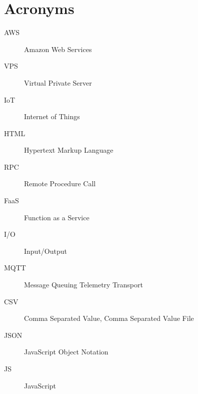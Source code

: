 \documentclass[../main.tex]{subfiles}
\begin{document}
\chapter{Acronyms}

\begin{description}
  \item[AWS] Amazon Web Services
  \item[VPS] Virtual Private Server
  \item[IoT] Internet of Things
  \item[HTML] Hypertext Markup Language
  \item[RPC] Remote Procedure Call
  \item[FaaS] Function as a Service
  \item[I/O] Input/Output
  \item[MQTT] Message Queuing Telemetry Transport
  \item[CSV] Comma Separated Value, Comma Separated Value File 
  \item[JSON] JavaScript Object Notation
  \item[JS] JavaScript
\end{description}

\end{document}
